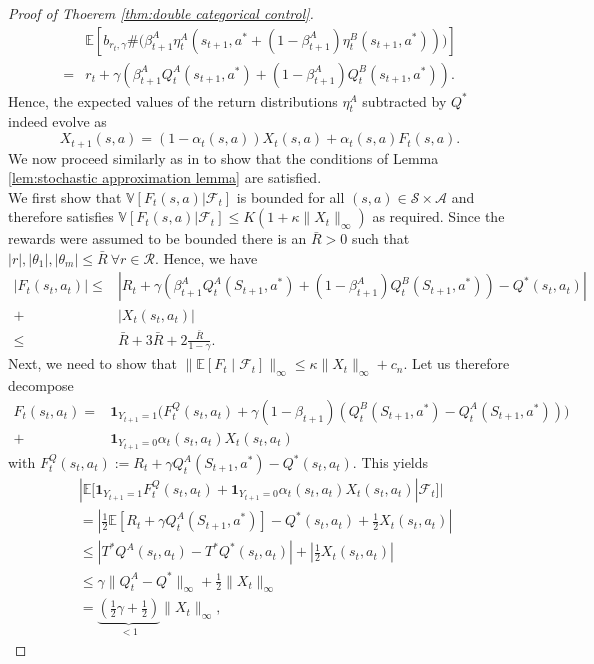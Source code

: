 \documentclass{article}
\newcommand{\cA}{\mathcal{A}}
\newcommand{\cF}{\mathcal{F}}
\newcommand{\cR}{\mathcal{R}}
\newcommand{\cS}{\mathcal{S}}
\newcommand{\E}{\mathbb{E}}
\newcommand{\V}{\mathbb{V}}
\theoremstyle{plain}
\theoremstyle{definition}
\theoremstyle{remark}
\begin{document}
\begin{proof}[Proof of Thoerem \ref{thm:double categorical control}]
   \begin{align*}
        &\E\left[b_{r_t, \gamma} \#\Big(\beta^A_{t+1}\eta_t^A(s_{t+1},a^*+(1-\beta^A_{t+1})\eta_t^B(s_{t+1},a^*))\Big)\right]\\
        =&r_t + \gamma(\beta^A_{t+1}Q_t^A(s_{t+1},a^*)+(1-\beta^A_{t+1})Q_t^B(s_{t+1},a^*)).
   \end{align*}
   Hence, the expected values of the return distributions $\eta_t^A$ subtracted by $Q^*$ indeed evolve as 
   \[X_{t+1}(s,a)=(1-\alpha_t(s,a))X_t(s,a)+\alpha_t(s,a)F_t(s,a).\]
   We now proceed similarly as in \cite{hasselt2010} to show that the conditions of Lemma \ref{lem:stochastic approximation lemma} are satisfied. \\
   We first show that $\V[F_t(s,a)|\cF_t]$ is bounded for all $(s,a)\in\cS\times\cA$ and therefore satisfies $\V[F_t(s,a)|\cF_t]\leq K(1+\kappa\|X_t\|_\infty)$ as required. Since the rewards were assumed to be bounded there is an $\bar R>0$ such that $|r|,|\theta_1|,|\theta_m|\leq\bar R\ \forall r\in\cR.$ Hence, we have
   \begin{align*}
   |F_t(s_t,a_t)|\leq&|R_t + \gamma(\beta^A_{t+1}Q_t^A(S_{t+1},a^*)+(1-\beta^A_{t+1})Q_t^B(S_{t+1},a^*))-Q^*(s_t,a_t)|\\
   +&|X_t(s_t,a_t)|\\
   \leq& \bar R + 3\bar R + 2\frac{\bar R}{1-\gamma}.
   \end{align*}
   Next, we need to show that $\|\E[F_t\mid\cF_t]\|_\infty\leq \kappa \|X_t\|_\infty+c_n.$ Let us therefore decompose
 \begin{align*}
       F_t(s_t,a_t)=&\textbf{1}_{Y_{t+1}=1}\Big(F_t^Q(s_t,a_t)+\gamma(1-\beta_{t+1})(Q_t^B(S_{t+1},a^*)-Q^A_t(S_{t+1},a^*))\Big)\\
       +&\textbf{1}_{Y_{t+1}=0}\alpha_t(s_t,a_t)X_t(s_t,a_t)
 \end{align*}
   with $F_t^Q(s_t,a_t):=R_t+\gamma Q^A_t(S_{t+1},a^*)-Q^*(s_t,a_t).$ This yields
   \begin{align*}
       &|\E[\textbf{1}_{Y_{t+1}=1}F_t^Q(s_t,a_t)+\textbf{1}_{Y_{t+1}=0}\alpha_t(s_t,a_t)X_t(s_t,a_t)|\cF_t]|\\
       &=|\frac{1}{2}\E[R_t+\gamma Q^A_t(S_{t+1},a^*)]-Q^*(s_t,a_t)+\frac{1}{2}X_t(s_t,a_t)|\\
       &\leq|T^*Q^A(s_t,a_t)-T^*Q^*(s_t,a_t)|+|\frac{1}{2}X_t(s_t,a_t)|\\
       &\leq\gamma \|Q^A_t-Q^*\|_\infty+\frac{1}{2}\|X_t\|_\infty \\
       &=\underbrace{(\frac{1}{2}\gamma+\frac{1}{2})}_{<1}\|X_t\|_\infty,

\end{align*}
\end{proof}
\end{document}
